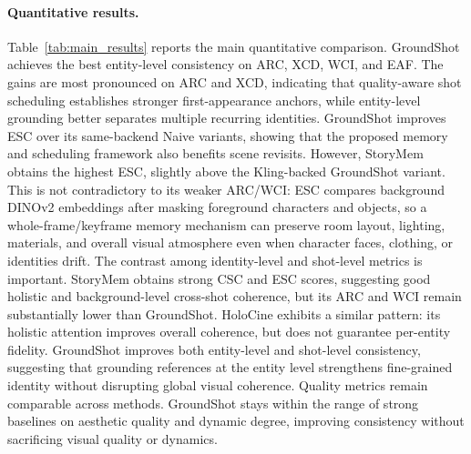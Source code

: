 \paragraph{Quantitative results.}
Table~\ref{tab:main_results} reports the main quantitative comparison. GroundShot achieves the best entity-level consistency on ARC, XCD, WCI, and EAF. The gains are most pronounced on ARC and XCD, indicating that quality-aware shot scheduling establishes stronger first-appearance anchors, while entity-level grounding better separates multiple recurring identities.
GroundShot improves ESC over its same-backend Naive variants, showing that the proposed memory and scheduling framework also benefits scene revisits. However, StoryMem obtains the highest ESC, slightly above the Kling-backed GroundShot variant. This is not contradictory to its weaker ARC/WCI: ESC compares background DINOv2 embeddings after masking foreground characters and objects, so a whole-frame/keyframe memory mechanism can preserve room layout, lighting, materials, and overall visual atmosphere even when character faces, clothing, or identities drift.
The contrast among identity-level and shot-level metrics is important. StoryMem obtains strong CSC and ESC scores, suggesting good holistic and background-level cross-shot coherence, but its ARC and WCI remain substantially lower than GroundShot. HoloCine exhibits a similar pattern: its holistic attention improves overall coherence, but does not guarantee per-entity fidelity. GroundShot improves both entity-level and shot-level consistency, suggesting that grounding references at the entity level strengthens fine-grained identity without disrupting global visual coherence.
Quality metrics remain comparable across methods. GroundShot stays within the range of strong baselines on aesthetic quality and dynamic degree, improving consistency without sacrificing visual quality or dynamics.

